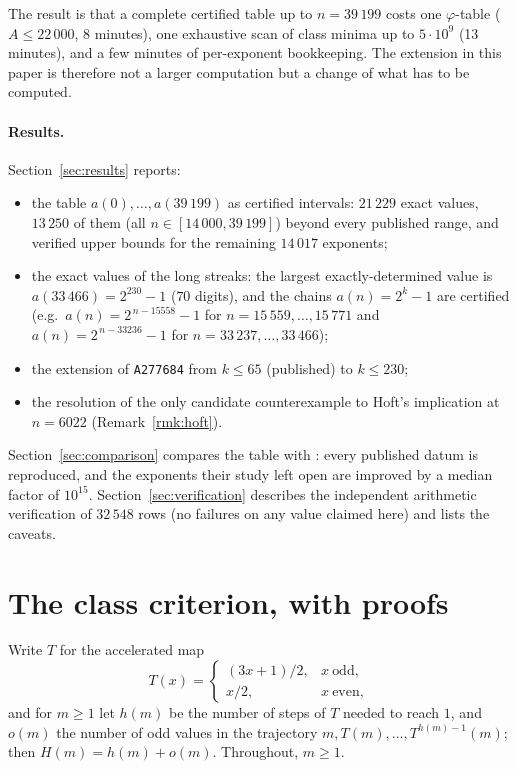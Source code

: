 \documentclass[11pt]{article}
\theoremstyle{remark}
\newcommand{\TT}{T}
\newcommand{\ooo}{o}
\newcommand{\hh}{h}
\begin{document}
The result is that a complete certified table up to $n=39\,199$ costs one $\varphi$-table
($A\le 22\,000$, 8 minutes), one exhaustive scan of class minima up to $5\cdot10^9$ (13 minutes), and a
few minutes of per-exponent bookkeeping. The extension in this paper is therefore not a larger
computation but a change of what has to be computed.

\paragraph{Results.} Section~\ref{sec:results} reports:
\begin{itemize}\itemsep2pt
\item the table $a(0),\dots,a(39\,199)$ as certified intervals: $21\,229$ exact values,
$13\,250$ of them (all $n\in[14\,000,39\,199]$) beyond every published range, and verified upper
bounds for the remaining $14\,017$ exponents;
\item the exact values of the long streaks: the largest exactly-determined value is
$a(33\,466)=2^{230}-1$ ($70$ digits), and the chains $a(n)=2^k-1$ are certified
(e.g.\ $a(n)=2^{\,n-15558}-1$ for $n=15\,559,\dots,15\,771$ and $a(n)=2^{\,n-33236}-1$ for $n=33\,237,\dots,33\,466$);
\item the extension of \texttt{A277684} from $k\le 65$ (published) to $k\le 230$;
\item the resolution of the only candidate counterexample to Hoft's implication at $n=6022$
(Remark~\ref{rmk:hoft}).
\end{itemize}
Section~\ref{sec:comparison} compares the table with \cite{frinkle2025}: every published datum is
reproduced, and the exponents their study left open are improved by a median factor of $10^{15}$.
Section~\ref{sec:verification} describes the independent arithmetic verification of $32\,548$ rows
(no failures on any value claimed here) and lists the caveats.

\section{The class criterion, with proofs}\label{sec:theory}

Write $\TT$ for the accelerated map
\[
\TT(x)=\begin{cases}(3x+1)/2,&x\ \text{odd},\\ x/2,&x\ \text{even},\end{cases}
\]
and for $m\ge1$ let $\hh(m)$ be the number of steps of $\TT$ needed to reach $1$, and $\ooo(m)$ the
number of odd values in the trajectory $m,\TT(m),\dots,\TT^{\hh(m)-1}(m)$; then $H(m)=\hh(m)+\ooo(m)$.
Throughout, $m\ge1$.
\end{document}

